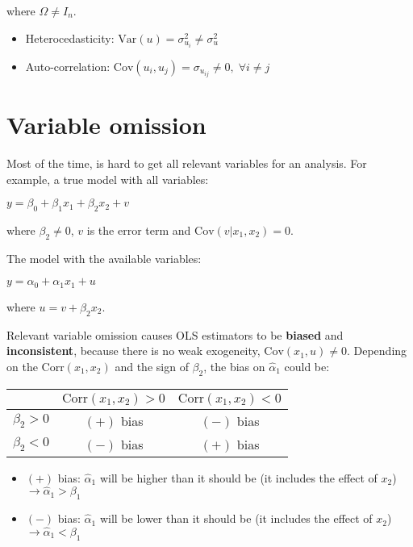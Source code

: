 \documentclass[10pt, a4paper, landscape]{article}
\newcommand{\Var}{\mathrm{Var}}
\newcommand{\Cov}{\mathrm{Cov}}
\newcommand{\Corr}{\mathrm{Corr}}
\begin{document}
\begin{multicols}{3}
		\quad where $\Omega \neq I_{n}$.
		
		\begin{itemize}[leftmargin=*]
			\item Heterocedasticity: $\Var(u) = \sigma^{2}_{u_i} \neq \sigma^{2}_{u}$
			\item Auto-correlation: $\Cov(u_{i}, u_{j}) = \sigma_{u_{ij}} \neq 0, \; \forall i \neq j$
		\end{itemize}
		
		\section*{Variable omission}
		
		Most of the time, is hard to get all relevant variables for an analysis. For example, a true model with all variables:
		
		\begin{center}
			$y = \beta_{0} + \beta_{1} x_{1} + \beta_{2} x_{2} + v$
		\end{center}
		
		\quad where $\beta_{2} \neq 0$, $v$ is the error term and $\Cov(v|x_{1},x_{2}) = 0$.
		
		The model with the available variables:
		
		\begin{center}
			$y = \alpha_{0} + \alpha_{1} x_{1} + u$
		\end{center}
		
		\quad where $u = v + \beta_{2} x_{2}$.
		
		Relevant variable omission causes OLS estimators to be \textbf{biased} and \textbf{inconsistent}, because there is no weak exogeneity, $\Cov(x_{1}, u) \neq 0$. Depending on the $\Corr(x_{1}, x_{2})$ and the sign of $\beta_{2}$, the bias on $\hat{\alpha}_{1}$ could be:
		
		\begin{center}
			\begin{tabular}{ c | c c }
				                & $\Corr(x_{1}, x_{2}) > 0$ & $\Corr(x_{1}, x_{2}) < 0$ \\ \hline
				$\beta_{2} > 0$ & $(+)$ bias                & $(-)$ bias                \\
				$\beta_{2} < 0$ & $(-)$ bias                & $(+)$ bias
			\end{tabular}
		\end{center}
		
		\begin{itemize}[leftmargin=*]
			\item $(+)$ bias: $\hat{\alpha}_{1}$ will be higher than it should be (it includes the effect of $x_{2}$) $\rightarrow \hat{\alpha}_{1} > \beta_{1}$
			\item $(-)$ bias: $\hat{\alpha}_{1}$ will be lower than it should be (it includes the effect of $x_{2}$) $\rightarrow \hat{\alpha}_{1} < \beta_{1}$
		\end{itemize}
		

\end{multicols}
\end{document}
